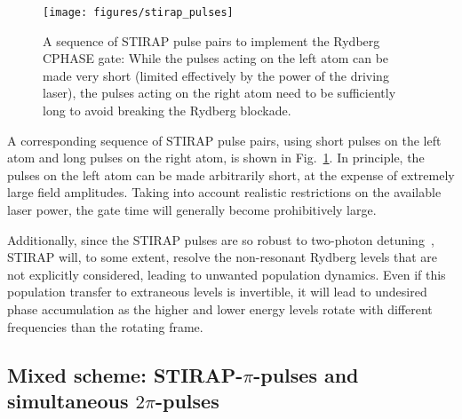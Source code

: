 \begin{figure}[tb]
  \begin{center}
    \texttt{[image: figures/stirap\_pulses]}
  \end{center}
  \caption{%
    A sequence of STIRAP pulse pairs to implement the
    Rydberg CPHASE gate: While the pulses acting on the left atom
    can be made very short (limited effectively by the power of the driving
    laser), the pulses acting on the right atom need to be sufficiently long to
    avoid breaking the Rydberg blockade.
  }
  \label{fig:Stirap}
\end{figure}
A corresponding  sequence of STIRAP pulse pairs, using short pulses on the left
atom and long pulses on the right atom,  is shown in Fig.~\ref{fig:Stirap}.
In principle, the pulses on the left atom can be made arbitrarily short,
at the expense of extremely large field amplitudes. Taking into account
realistic restrictions on the available laser power, the gate time will
generally become prohibitively large.

Additionally, since the STIRAP pulses are so robust to two-photon
detuning~\cite{grigoryan2001adiabatic}, STIRAP will, to some extent, resolve the
non-resonant Rydberg levels that are not explicitly considered, leading to
unwanted population dynamics. Even if this population transfer to extraneous
levels is invertible, it will lead to undesired phase accumulation as the higher
and lower energy levels rotate with different frequencies than the rotating
frame.

\subsection{Mixed scheme: STIRAP-$\pi$-pulses and simultaneous
  $2\pi$-pulses}
\label{subsec:RydMixed}

